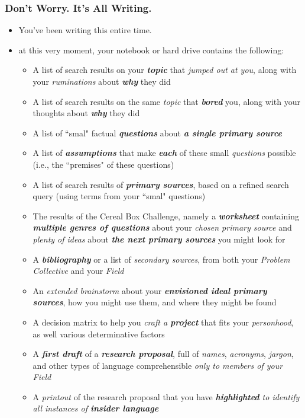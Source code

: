 \documentclass[11pt]{article}
\begin{document}
\subsubsection{Don’t Worry. It’s All Writing.}
\begin{itemize}
\item You’ve been writing this entire time.

\item at this very moment, your notebook or hard drive contains the following:
\begin{itemize}
\item A list of search results on your \emph{\textbf{topic}} that \emph{jumped out at you}, along with your \emph{ruminations} about \emph{\textbf{why}} they did
\item A list of search results on the same \emph{topic} that \emph{\textbf{bored}} you, along with your thoughts about \emph{\textbf{why}} they did
\item A list of ``smal" factual \emph{\textbf{questions}} about \emph{\textbf{a single primary source}}
\item A list of \emph{\textbf{assumptions}} that make \emph{\textbf{each}} of these small \emph{questions} possible (i.e., the ``premises" of these questions)
\item A list of search results of \emph{\textbf{primary sources}}, based on a refined search query (using terms from your ``smal" questions)
\item The results of the Cereal Box Challenge, namely a \emph{\textbf{worksheet}} containing \emph{\textbf{multiple genres of questions}} about your \emph{chosen primary source} and \emph{plenty of ideas} about \emph{\textbf{the next primary sources}} you might look for
\item A \emph{\textbf{bibliography}} or a list of \emph{secondary sources}, from both your \emph{Problem Collective} and your \emph{Field}
\item An \emph{extended brainstorm} about your \emph{\textbf{envisioned ideal primary sources}}, how you might use them, and where they might be found
\item A decision matrix to help you \emph{craft a \textbf{project}} that fits your \emph{personhood}, as well various determinative factors
\item A \emph{\textbf{first draft}} of a \emph{\textbf{research proposal}}, full of \emph{names}, \emph{acronyms}, \emph{jargon}, and other types of language comprehensible \emph{only to members of your Field}
\item A \emph{printout} of the research proposal that you have \emph{\textbf{highlighted} to identify all instances of \textbf{insider language}}

\end{itemize}
\end{itemize}
\end{document}
